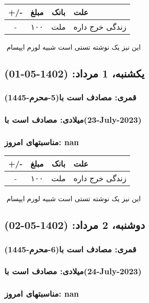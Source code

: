 \documentclass{article}
\newcommand{\rnote}[1]{\marginpar{\textcolor{color}{\StrSubstitute{\##1}{ }{\_}}}}
\newcommand{\myRow}[4]{
    #1 & #2 & #3 & #4 \\ \hline
}
\begin{document}
\begin{tabular}{ | c | c | c | p{5cm} |}
    \hline
    \myRow{ +/- }{مبلغ}{بانک}{علت}
    \myRow{-}{۱۰۰}{ملت}{زندگی خرج داره}
\end{tabular}
\newline
\newline

‌
\rnote{تست}
این نیز یک نوشته تستی است شبیه لورم ایپسام




\newpage
{}
\textcolor{color}{
\section{ یکشنبه، 1 مرداد: (1402-05-01) }
\subsubsection*{قمری: مصادف است با(5-محرم-1445)} 
\subsubsection*{میلادی: مصادف است با(23-July-2023)}
\subsubsection*{مناسبتهای امروز: nan}
}


\begin{tabular}{ | c | c | c | p{5cm} |}
    \hline
    \myRow{ +/- }{مبلغ}{بانک}{علت}
    \myRow{-}{۱۰۰}{ملت}{زندگی خرج داره}
\end{tabular}
\newline
\newline

‌
\rnote{تست}
این نیز یک نوشته تستی است شبیه لورم ایپسام




\newpage
{}
\textcolor{color}{
\section{ دوشنبه، 2 مرداد: (1402-05-02) }
\subsubsection*{قمری: مصادف است با(6-محرم-1445)} 
\subsubsection*{میلادی: مصادف است با(24-July-2023)}
\subsubsection*{مناسبتهای امروز: nan}
}
\end{document}
